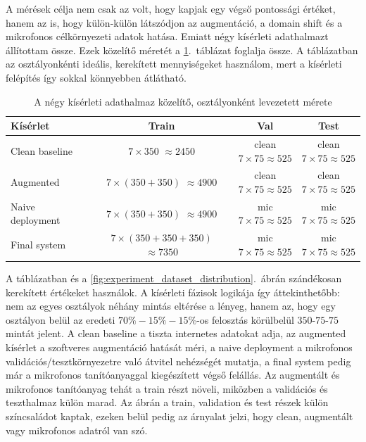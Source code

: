 A mérések célja nem csak az volt, hogy kapjak egy végső pontossági értéket, hanem az is, hogy külön-külön látszódjon az augmentáció, a domain shift és a mikrofonos célkörnyezeti adatok hatása. Emiatt négy kísérleti adathalmazt állítottam össze. Ezek közelítő méretét a \ref{tab:experiment_dataset_sizes}.~táblázat foglalja össze. A táblázatban az osztályonkénti ideális, kerekített mennyiségeket használom, mert a kísérleti felépítés így sokkal könnyebben átlátható.

\begin{table}[H]
\centering
\caption{A négy kísérleti adathalmaz közelítő, osztályonként levezetett mérete}
\label{tab:experiment_dataset_sizes}
\small
\begin{tabular}{lccc}
\toprule
\textbf{Kísérlet} & \textbf{Train} & \textbf{Val} & \textbf{Test} \\
\midrule
Clean baseline & \shortstack{\(7 \times 350\)\\\(\approx 2450\)} & \shortstack{clean\\\(7 \times 75 \approx 525\)} & \shortstack{clean\\\(7 \times 75 \approx 525\)} \\
Augmented & \shortstack{\(7 \times (350 + 350)\)\\\(\approx 4900\)} & \shortstack{clean\\\(7 \times 75 \approx 525\)} & \shortstack{clean\\\(7 \times 75 \approx 525\)} \\
Naive deployment & \shortstack{\(7 \times (350 + 350)\)\\\(\approx 4900\)} & \shortstack{mic\\\(7 \times 75 \approx 525\)} & \shortstack{mic\\\(7 \times 75 \approx 525\)} \\
Final system & \shortstack{\(7 \times (350 + 350 + 350)\)\\\(\approx 7350\)} & \shortstack{mic\\\(7 \times 75 \approx 525\)} & \shortstack{mic\\\(7 \times 75 \approx 525\)} \\
\bottomrule
\end{tabular}
\end{table}

A táblázatban és a \ref{fig:experiment_dataset_distribution}.~ábrán szándékosan kerekített értékeket használok. A kísérleti fázisok logikája így áttekinthetőbb: nem az egyes osztályok néhány mintás eltérése a lényeg, hanem az, hogy egy osztályon belül az eredeti \(70\%-15\%-15\%\)-os felosztás körülbelül \(350\)-\(75\)-\(75\) mintát jelent. A clean baseline a tiszta internetes adatokat adja, az augmented kísérlet a szoftveres augmentáció hatását méri, a naive deployment a mikrofonos validációs/tesztkörnyezetre való átvitel nehézségét mutatja, a final system pedig már a mikrofonos tanítóanyaggal kiegészített végső felállás. Az augmentált és mikrofonos tanítóanyag tehát a train részt növeli, miközben a validációs és teszthalmaz külön marad. Az ábrán a train, validation és test részek külön színcsaládot kaptak, ezeken belül pedig az árnyalat jelzi, hogy clean, augmentált vagy mikrofonos adatról van szó.

